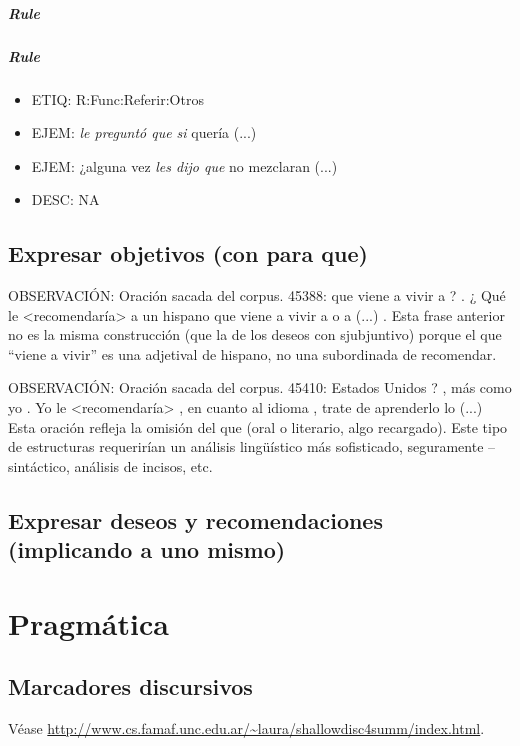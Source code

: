 \documentclass[11pt]{report}
\begin{document}
\paragraph*{Rule}
\paragraph*{Rule}
\begin{itemize}
\item ETIQ: R:Func:Referir:Otros
\item EJEM: \emph{le preguntó que si} quería (...)
\item EJEM: ¿alguna vez \emph{les dijo que} no mezclaran (...)
\item DESC: NA
\end{itemize}

\section{Expresar objetivos (con para que)}
OBSERVACIÓN: Oración sacada del corpus. 45388:  que viene a vivir a ? . ¿ Qué le <recomendaría> a un hispano que viene a vivir a o a (...) . Esta frase anterior no es la misma construcción (que la de los deseos con sjubjuntivo) porque el que ``viene a vivir'' es una adjetival de hispano, no una subordinada de recomendar.

OBSERVACIÓN:  Oración sacada del corpus. 45410:  Estados Unidos ? , más como yo . Yo le <recomendaría> , en cuanto al idioma , trate de aprenderlo lo (...) Esta oración refleja la omisión del que (oral o literario, algo recargado). Este tipo de estructuras requerirían un análisis lingüístico más sofisticado, seguramente -- sintáctico, análisis de incisos, etc.

\section{Expresar deseos y recomendaciones (implicando a uno mismo)}
\chapter{Pragmática}
\section{Marcadores discursivos}
Véase \url{http://www.cs.famaf.unc.edu.ar/~laura/shallowdisc4summ/index.html}.
\end{document}
